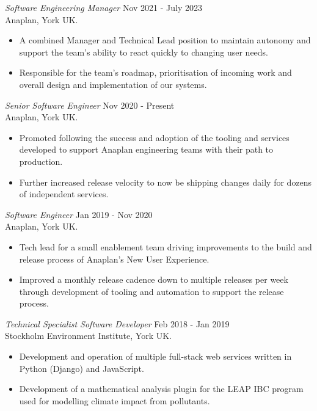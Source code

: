 \documentclass[margin]{res}
\begin{document}
\begin{resume}
{\sl Software Engineering Manager} \hfill Nov 2021 - July 2023  \\
Anaplan, York UK.
\begin{itemize}  \itemsep -2pt %
  \item A combined Manager and Technical Lead position to
        maintain autonomy and support the team's ability to react
        quickly to changing user needs.
  \item Responsible for the team's roadmap, prioritisation of incoming
        work and overall design and implementation of our systems.
\end{itemize}

{\sl Senior Software Engineer} \hfill Nov 2020 - Present  \\
Anaplan, York UK.
\begin{itemize}  \itemsep -2pt %
  \item Promoted following the success and adoption of the tooling and
        services developed to support Anaplan engineering teams with
        their path to production.
  \item Further increased release velocity to now be shipping changes
        daily for dozens of independent services.
\end{itemize}

{\sl Software Engineer} \hfill Jan 2019 - Nov 2020 \\
Anaplan, York UK.
\begin{itemize}  \itemsep -2pt %
  \item Tech lead for a small enablement team driving improvements to
        the build and release process of Anaplan's New User Experience.
  \item Improved a monthly release cadence down to multiple releases per
        week through development of tooling and automation to support the
        release process.
\end{itemize}

{\sl Technical Specialist Software Developer} \hfill Feb 2018 - Jan 2019 \\
Stockholm Environment Institute, York UK.
\begin{itemize}  \itemsep -2pt %
  \item Development and operation of multiple full-stack web services written
        in Python (Django) and JavaScript.
  \item Development of a mathematical analysis plugin for the LEAP IBC program
        used for modelling climate impact from pollutants.
\end{itemize}


\end{resume}
\end{document}
